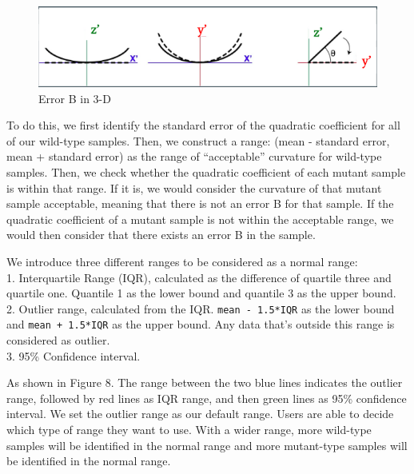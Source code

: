 \documentclass[10pt,letterpaper]{article}
\begin{document}
\begin{figure}[H]
\includegraphics[width=0.9\linewidth]{visualization_paper/error_correctionB} \caption{Error B in 3-D}\label{fig:Figure7}
\end{figure}

To do this, we first identify the standard error of the quadratic
coefficient for all of our wild-type samples. Then, we construct a
range: (mean - standard error, mean + standard error) as the range of
``acceptable'' curvature for wild-type samples. Then, we check whether
the quadratic coefficient of each mutant sample is within that range. If
it is, we would consider the curvature of that mutant sample acceptable,
meaning that there is not an error B for that sample. If the quadratic
coefficient of a mutant sample is not within the acceptable range, we
would then consider that there exists an error B in the sample.

We introduce three different ranges to be considered as a normal
range:\\
1. Interquartile Range (IQR), calculated as the difference of quartile
three and quartile one. Quantile 1 as the lower bound and quantile 3 as
the upper bound.\\
2. Outlier range, calculated from the IQR. \texttt{mean\ -\ 1.5*IQR} as
the lower bound and \texttt{mean\ +\ 1.5*IQR} as the upper bound. Any
data that's outside this range is considered as outlier.\\
3. 95\% Confidence interval.

As shown in Figure 8. The range between the two blue lines indicates the
outlier range, followed by red lines as IQR range, and then green lines
as 95\% confidence interval. We set the outlier range as our default
range. Users are able to decide which type of range they want to use.
With a wider range, more wild-type samples will be identified in the
normal range and more mutant-type samples will be identified in the
normal range.
\end{document}
